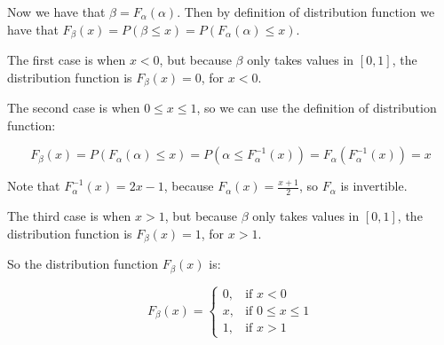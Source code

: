 Now we have that $\beta = F_{\alpha}(\alpha)$. Then by definition of distribution function
we have that $F_{\beta}(x) = P(\beta \leq x) = P(F_{\alpha}(\alpha) \leq x)$.

The first case is when $x < 0$, but because $\beta$ only takes values in
$[0, 1]$, the distribution function is $F_{\beta}(x) = 0$, for $x < 0$.

The second case is when $0 \leq x \leq 1$, so we can use the definition of
distribution function:

\begin{equation}
    F_{\beta}(x) = P(F_{\alpha}(\alpha) \leq x) = P(\alpha \leq F_{\alpha}^{-1}(x)) = F_{\alpha}(F_{\alpha}^{-1}(x)) = x
\end{equation}

Note that $F_{\alpha}^{-1}(x) = 2x - 1$, because $F_{\alpha}(x) = \frac{x + 1}{2}$, so $F_{\alpha}$ is invertible.

The third case is when $x > 1$, but because $\beta$ only takes values in
$[0, 1]$, the distribution function is $F_{\beta}(x) = 1$, for $x > 1$.

So the distribution function $F_{\beta}(x)$ is:

\begin{equation}
    F_{\beta}(x) = \begin{cases}
        0, & \text{if } x < 0           \\
        x, & \text{if } 0 \leq x \leq 1 \\
        1, & \text{if } x > 1
    \end{cases}
\end{equation}